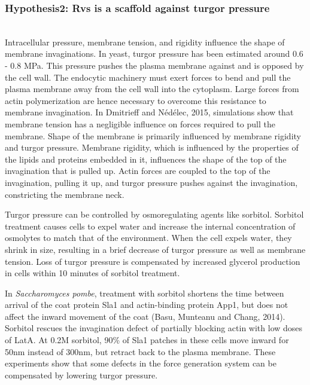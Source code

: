 \subsubsection{Hypothesis2: Rvs is a scaffold against turgor pressure} 
	
	\mbox{}\\
Intracellular pressure, membrane tension, and rigidity influence the shape of membrane invaginations. In yeast, turgor pressure has been estimated around 0.6 - 0.8 MPa. This pressure pushes the plasma membrane against and is opposed by the cell wall. The endocytic machinery must exert forces to bend and pull the plasma membrane away from the cell wall into the cytoplasm. Large forces from actin polymerization are hence necessary to overcome this resistance to membrane invagination. In Dmitrieff and Nédélec, 2015, simulations show that membrane tension has a negligible influence on forces required to pull the membrane. Shape of the membrane is primarily influenced by membrane rigidity and turgor pressure. Membrane rigidity, which is influenced by the properties of the lipids and proteins embedded in it, influences the shape of the top of the invagination that is pulled up. Actin forces are coupled to the top of the invagination, pulling it up, and turgor pressure pushes against the invagination, constricting the membrane neck.  
\vspace{5mm}

Turgor pressure can be controlled by osmoregulating agents like sorbitol. Sorbitol treatment causes cells to expel water and increase the internal concentration of osmolytes to match that of the environment. When the cell expels water, they shrink in size, resulting in a brief decrease of turgor pressure as well as membrane tension. Loss of turgor pressure is compensated by increased glycerol production in cells within 10 minutes of sorbitol treatment.
\vspace{5mm}

In \textit{Saccharomyces pombe}, treatment with sorbitol shortens the time between arrival of the coat protein Sla1 and actin-binding protein App1, but does not affect the inward movement of the coat (Basu, Munteanu and Chang, 2014). Sorbitol rescues the invagination defect of partially blocking actin with low doses of LatA. At 0.2M sorbitol, 90\% of Sla1 patches in these cells move inward for 50nm instead of 300nm, but retract back to the plasma membrane. These experiments show that some defects in the force generation system can be compensated by lowering turgor pressure.  
\vspace{5mm}

